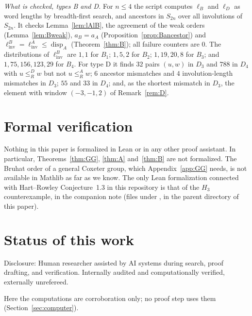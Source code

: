 \documentclass[11pt]{amsart}
\theoremstyle{definition}
\theoremstyle{remark}
\numberwithin{equation}{section}
\newcommand{\linv}{\ell_{\mathrm{inv}}}
\newcommand{\leR}{\le_R}
\DeclareMathOperator{\disp}{disp}
\begin{document}
\emph{What is checked, types B and D.} For \(n\le4\) the script computes \(\ell_B\) and \(\ell_D\) as word lengths by breadth-first search, and ancestors in \(S_{2n}\) over all involutions of \(S_{2n}\). It checks Lemma~\ref{lem:lAlB}, the agreement of the weak orders (Lemma~\ref{lem:Bweak}), \(a_B=a_A\) (Proposition~\ref{prop:Bancestor}) and \(\linv^B=\linv^A\le\disp_A\) (Theorem~\ref{thm:B}); all failure counters are \(0\). The distributions of \(\linv^B\) are \(1,1\) for \(B_1\); \(1,5,2\) for \(B_2\); \(1,19,20,8\) for \(B_3\); and \(1,75,156,123,29\) for \(B_4\). For type D it finds \(32\) pairs \((u,w)\) in \(D_3\) and \(788\) in \(D_4\) with \(u\leR^D w\) but not \(u\leR^A w\); \(6\) ancestor mismatches and \(4\) involution-length mismatches in \(D_3\); \(55\) and \(33\) in \(D_4\); and, as the shortest mismatch in \(D_3\), the element with window \((-3,-1,2)\) of Remark~\ref{rem:D}.

\section{Formal verification}\label{sec:lean}

Nothing in this paper is formalized in Lean or in any other proof assistant. In particular, Theorems~\ref{thm:GG}, \ref{thm:A} and~\ref{thm:B} are not formalized. The Bruhat order of a general Coxeter group, which Appendix~\ref{app:GG} needs, is not available in Mathlib as far as we know. The only Lean formalization connected with Hart--Rowley Conjecture~1.3 in this repository is that of the \(H_3\) counterexample, in the companion note (files under , in the parent directory of this paper).

\section{Status of this work}\label{sec:status}

Disclosure: Human researcher assisted by AI systems during search, proof drafting, and verification. Internally audited and computationally verified, externally unrefereed.

Here the computations are corroboration only; no proof step uses them (Section~\ref{sec:computer}).
\end{document}
